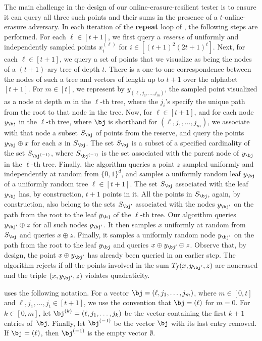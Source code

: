 \documentclass[11pt]{article}
\numberwithin{equation}{section}
\theoremstyle{definition}
\theoremstyle{plain}
\begin{document}
The main challenge in the design of our online-erasure-resilient tester is to ensure it can  query all three such points and their sums in the presence of a $t$-online-erasure adversary. In each iteration of the \textbf{repeat} loop of , the following steps are performed. 
For each $\ell \in [t+1]$, we first query a \emph{reserve} of uniformly and independently sampled points  $x_i^{(\ell)}$ for $i \in [(t+1)^2(2t+1)^t]$. 
Next, for each $\ell \in [t+1]$, we query a set of points that we visualize as being the nodes of a $(t+1)$-ary tree of depth $t$. 
There is a one-to-one correspondence between the nodes of such a tree and vectors of length up to $t + 1$ over the alphabet $[t+1]$.
For $m \in [t]$, we represent by $y_{(\ell,j_1,\dots,j_m)}$, the sampled point visualized as a node at depth $m$ in the $\ell$-th tree, where the $j_i$'s specify the unique path from the root to that node in the tree.
Now, for $\ell \in [t+1]$, and for each node $y_{\bj}$ in the $\ell$-th tree, where $\bj$ is shorthand for $(\ell,j_1,\dots,j_m)$, we associate with that node a subset $S_{\bj}$ of points from the reserve, and query the points $y_{\bj} \oplus x$ for each $x$ in $S_{\bj}$. The set $S_{\bj}$ is a subset of a specified cardinality of the set $S_{\bj^{(-1)}}$, where $S_{\bj^{(-1)}}$ is the set associated with the parent node of $y_{\bj}$ in the $\ell$-th tree.
Finally, the algorithm queries a point $z$ sampled uniformly and independently at random from $\{0,1\}^d$, and samples a uniformly random leaf $y_{\bj}$ of a uniformly random tree $\ell \in [t+1]$. 
The set $S_{\bj}$ associated with the leaf $y_{\bj}$ has, by construction, $t+1$ points in it. 
All the points in $S_{\bj}$, again, by construction, also belong to the sets $S_{\bj'}$ associated with the nodes $y_{\bj'}$ on the path from the root to the leaf $y_{\bj}$ of the $\ell$-th tree. 
Our algorithm queries $y_{\bj'}\oplus z$ for all such nodes $y_{\bj'}$.
It then samples $x$ uniformly at random from $S_{\bj}$ and queries $x \oplus z$. Finally, it samples a uniformly random node $y_{\bj'}$ on the path from the root to the leaf $y_{\bj}$ and queries $x \oplus y_{\bj'} \oplus z$.
Observe that, by design, the point $x \oplus y_{\bj'}$ has already been queried in an earlier step.
The algorithm rejects if all the points
involved in the sum $T_f(x, y_{\bj'}, z)$  are nonerased and the triple $(x, y_{\bj'}, z)$ violates quadraticity.



 uses the following notation.
For a vector $\bj = (\ell, j_1, \dots, j_m)$, where $m \in [0,t]$ and $\ell, j_1, \dots, j_t \in [t+1]$, we use the convention that $\bj = (\ell)$ for $m=0$. For $ k \in[0,m]$, let $\bj^{(k)} = (\ell, j_1, \dots, j_k)$ be the vector containing the first $k+1$ entries of~$\bj$. Finally, let $\bj^{(-1)}$ be the vector $\bj$ with its last entry removed. If $\bj = (\ell)$, then $\bj^{(-1)}$ is the empty vector $\emptyset$.
\end{document}
